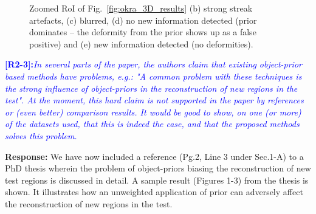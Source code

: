 \documentclass[11pt]{article}
\begin{document}
\begin{figure}[p]
\hfill
{}
\caption[Zoomed results of Okra dataset]{Zoomed RoI of Fig.~\ref{fig:okra_3D_results} (b) strong streak artefacts, (c) blurred, (d) no new  information detected (prior dominates -- the deformity from the prior
  shows up as a false positive) and (e) new information detected (no deformities).}
\label{fig:okra_zoomed_3D_results}
\end{figure}

\vspace{0.5cm}\textcolor{blue}{\textbf{[R2-3]:}\textit{In several parts of the
    paper, the authors claim that existing object-prior based methods
    have problems, e.g.: "A common problem with these techniques is
    the strong influence of object-priors in the reconstruction of new
    regions in the test". At the moment, this hard claim is not
    supported in the paper by references or (even better) comparison
    results. It would be good to show, on one (or more) of the
    datasets used, that this is indeed the case, and that the proposed
    methods solves this problem.}}

\textbf{Response:} We have now included a reference (Pg.2, Line 3
under Sec.1-A) to a PhD thesis wherein the problem of object-priors
biasing the reconstruction of new test regions is discussed in detail.
A sample result (Figures 1-3) from the thesis is shown. It
illustrates how an unweighted application of prior can adversely
affect the reconstruction of new regions in the test.
\end{document}
